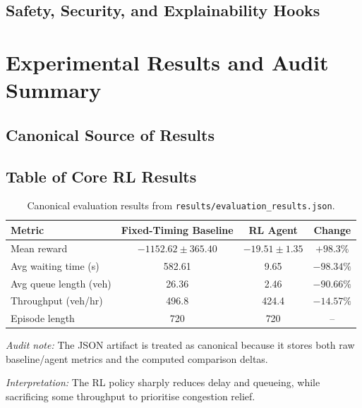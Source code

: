 \documentclass[conference]{IEEEtran}
\begin{document}
\subsection{Safety, Security, and Explainability Hooks}

\section{Experimental Results and Audit Summary}
\subsection{Canonical Source of Results}

\subsection{Table of Core RL Results}
\begin{table}[t]
\centering
\caption{Canonical evaluation results from \texttt{results/evaluation\_results.json}.}
\label{tab:rl-results}
\begin{threeparttable}
\begin{tabular}{lccc}
\toprule
\textbf{Metric} & \textbf{Fixed-Timing Baseline} & \textbf{RL Agent} & \textbf{Change} \\
\midrule
Mean reward & $-1152.62 \pm 365.40$ & $-19.51 \pm 1.35$ & $+98.3\%$ \\
Avg waiting time (s) & 582.61 & 9.65 & $-98.34\%$ \\
Avg queue length (veh) & 26.36 & 2.46 & $-90.66\%$ \\
Throughput (veh/hr) & 496.8 & 424.4 & $-14.57\%$ \\
Episode length & 720 & 720 & -- \\
\bottomrule
\end{tabular}
\begin{tablenotes}
\footnotesize
\item \textit{Audit note:} The JSON artifact is treated as canonical because it stores both raw baseline/agent metrics and the computed comparison deltas.
\item \textit{Interpretation:} The RL policy sharply reduces delay and queueing, while sacrificing some throughput to prioritise congestion relief.
\end{tablenotes}
\end{threeparttable}
\end{table}
\end{document}

